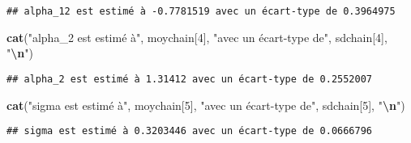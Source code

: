 \documentclass[
]{article}
\newenvironment{Shaded}{\begin{snugshade}}{\end{snugshade}}
\newcommand{\DecValTok}[1]{\textcolor[rgb]{0.00,0.00,0.81}{#1}}
\newcommand{\FunctionTok}[1]{\textcolor[rgb]{0.13,0.29,0.53}{\textbf{#1}}}
\newcommand{\NormalTok}[1]{#1}
\newcommand{\SpecialCharTok}[1]{\textcolor[rgb]{0.81,0.36,0.00}{\textbf{#1}}}
\newcommand{\StringTok}[1]{\textcolor[rgb]{0.31,0.60,0.02}{#1}}
\begin{document}
\begin{verbatim}
## alpha_12 est estimé à -0.7781519 avec un écart-type de 0.3964975
\end{verbatim}

\begin{Shaded}
\begin{Highlighting}[]
\FunctionTok{cat}\NormalTok{(}\StringTok{"alpha\_2 est estimé à"}\NormalTok{, moychain[}\DecValTok{4}\NormalTok{], }\StringTok{"avec un écart{-}type de"}\NormalTok{, sdchain[}\DecValTok{4}\NormalTok{], }\StringTok{"}\SpecialCharTok{\textbackslash{}n}\StringTok{"}\NormalTok{)}
\end{Highlighting}
\end{Shaded}

\begin{verbatim}
## alpha_2 est estimé à 1.31412 avec un écart-type de 0.2552007
\end{verbatim}

\begin{Shaded}
\begin{Highlighting}[]
\FunctionTok{cat}\NormalTok{(}\StringTok{"sigma est estimé à"}\NormalTok{, moychain[}\DecValTok{5}\NormalTok{], }\StringTok{"avec un écart{-}type de"}\NormalTok{, sdchain[}\DecValTok{5}\NormalTok{], }\StringTok{"}\SpecialCharTok{\textbackslash{}n}\StringTok{"}\NormalTok{)}
\end{Highlighting}
\end{Shaded}

\begin{verbatim}
## sigma est estimé à 0.3203446 avec un écart-type de 0.0666796
\end{verbatim}
\end{document}
